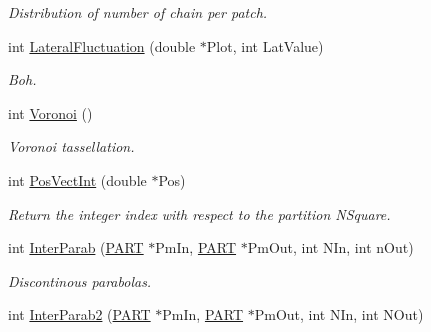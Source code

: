 \begin{DoxyCompactItemize}
\begin{DoxyCompactList}\small\item\em \-Distribution of number of chain per patch. \end{DoxyCompactList}\item 
\hypertarget{classVarData_a70ff47b5567c5401febca3a9ab77f9ab}{int \hyperlink{classVarData_a70ff47b5567c5401febca3a9ab77f9ab}{\-Lateral\-Fluctuation} (double $\ast$\-Plot, int \-Lat\-Value)}\label{classVarData_a70ff47b5567c5401febca3a9ab77f9ab}

\begin{DoxyCompactList}\small\item\em \-Boh. \end{DoxyCompactList}\item 
\hypertarget{classVarData_a74028c96f1da61fd4bb0b0df6c720bc0}{int \hyperlink{classVarData_a74028c96f1da61fd4bb0b0df6c720bc0}{\-Voronoi} ()}\label{classVarData_a74028c96f1da61fd4bb0b0df6c720bc0}

\begin{DoxyCompactList}\small\item\em \-Voronoi tassellation. \end{DoxyCompactList}\item 
\hypertarget{classVarData_a0f777b6a01b8a40aed0245854cda4e58}{int \hyperlink{classVarData_a0f777b6a01b8a40aed0245854cda4e58}{\-Pos\-Vect\-Int} (double $\ast$\-Pos)}\label{classVarData_a0f777b6a01b8a40aed0245854cda4e58}

\begin{DoxyCompactList}\small\item\em \-Return the integer index with respect to the partition \-N\-Square. \end{DoxyCompactList}\item 
\hypertarget{classVarData_ac526ef733a76db5259feea1b985eeeaf}{int \hyperlink{classVarData_ac526ef733a76db5259feea1b985eeeaf}{\-Inter\-Parab} (\hyperlink{structPART}{\-P\-A\-R\-T} $\ast$\-Pm\-In, \hyperlink{structPART}{\-P\-A\-R\-T} $\ast$\-Pm\-Out, int \-N\-In, int n\-Out)}\label{classVarData_ac526ef733a76db5259feea1b985eeeaf}

\begin{DoxyCompactList}\small\item\em \-Discontinous parabolas. \end{DoxyCompactList}\item 
\hypertarget{classVarData_a75e10cd80f78c0d544133f954c194a00}{int \hyperlink{classVarData_a75e10cd80f78c0d544133f954c194a00}{\-Inter\-Parab2} (\hyperlink{structPART}{\-P\-A\-R\-T} $\ast$\-Pm\-In, \hyperlink{structPART}{\-P\-A\-R\-T} $\ast$\-Pm\-Out, int \-N\-In, int \-N\-Out)}\label{classVarData_a75e10cd80f78c0d544133f954c194a00}


\end{DoxyCompactItemize}
